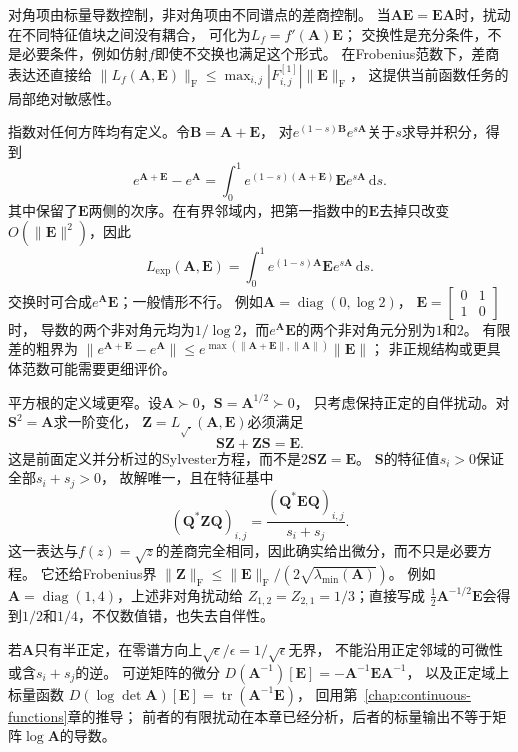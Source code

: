 对角项由标量导数控制，非对角项由不同谱点的差商控制。
当$\bm A\bm E=\bm E\bm A$时，扰动在不同特征值块之间没有耦合，
可化为$L_f=f'(\bm A)\bm E$；
交换性是充分条件，不是必要条件，例如仿射$f$即使不交换也满足这个形式。
在Frobenius范数下，差商表达还直接给
$\lVert L_f(\bm A,\bm E)\rVert_{\mathrm F}
\leq\max_{i,j}|F^{[1]}_{i,j}|\lVert\bm E\rVert_{\mathrm F}$，
这提供当前函数任务的局部绝对敏感性。

指数对任何方阵均有定义。令$\bm B=\bm A+\bm E$，
对$e^{(1-s)\bm B}e^{s\bm A}$关于$s$求导并积分，得到
\[
 e^{\bm A+\bm E}-e^{\bm A}
 =\int_0^1e^{(1-s)(\bm A+\bm E)}\bm E e^{s\bm A}\,\mathrm ds.
\]
其中保留了$\bm E$两侧的次序。在有界邻域内，把第一指数中的$\bm E$去掉只改变
$O(\lVert\bm E\rVert^2)$，因此
\begin{equation}
 L_{\exp}(\bm A,\bm E)
 =\int_0^1e^{(1-s)\bm A}\bm E e^{s\bm A}\,\mathrm ds.
 \label{eq:matrix-analysis-exponential-frechet-derivative}
\end{equation}
交换时可合成$e^{\bm A}\bm E$；一般情形不行。
例如$\bm A=\operatorname{diag}(0,\log2)$，
$\bm E=\left[\begin{smallmatrix}0&1\\1&0\end{smallmatrix}\right]$时，
导数的两个非对角元均为$1/\log2$，而$e^{\bm A}\bm E$的两个非对角元分别为$1$和$2$。
有限差的粗界为
$\lVert e^{\bm A+\bm E}-e^{\bm A}\rVert
\leq e^{\max(\lVert\bm A+\bm E\rVert,\lVert\bm A\rVert)}\lVert\bm E\rVert$；
非正规结构或更具体范数可能需要更细评价。

平方根的定义域更窄。设$\bm A\succ0$，$\bm S=\bm A^{1/2}\succ0$，
只考虑保持正定的自伴扰动。对$\bm S^2=\bm A$求一阶变化，
$\bm Z=L_{\sqrt{\cdot}}(\bm A,\bm E)$必须满足
\[
 \bm S\bm Z+\bm Z\bm S=\bm E.
\]
这是前面定义并分析过的Sylvester方程，而不是$2\bm S\bm Z=\bm E$。
$\bm S$的特征值$s_i>0$保证全部$s_i+s_j>0$，
故解唯一，且在特征基中
\[
 (\bm Q^*\bm Z\bm Q)_{i,j}
 =\frac{(\bm Q^*\bm E\bm Q)_{i,j}}{s_i+s_j}.
\]
这一表达与$f(z)=\sqrt z$的差商完全相同，因此确实给出微分，而不只是必要方程。
它还给Frobenius界
$\lVert\bm Z\rVert_{\mathrm F}
\leq\lVert\bm E\rVert_{\mathrm F}/(2\sqrt{\lambda_{\min}(\bm A)})$。
例如$\bm A=\operatorname{diag}(1,4)$，上述非对角扰动给
$Z_{1,2}=Z_{2,1}=1/3$；直接写成
$\tfrac12\bm A^{-1/2}\bm E$会得到$1/2$和$1/4$，不仅数值错，也失去自伴性。

若$\bm A$只有半正定，在零谱方向上$\sqrt\epsilon/\epsilon=1/\sqrt\epsilon$无界，
不能沿用正定邻域的可微性或含$s_i+s_j$的逆。
可逆矩阵的微分
$D(\bm A^{-1})[\bm E]=-\bm A^{-1}\bm E\bm A^{-1}$，
以及正定域上标量函数
$D(\log\det\bm A)[\bm E]=\operatorname{tr}(\bm A^{-1}\bm E)$，
回用第~\ref{chap:continuous-functions}章的推导；
前者的有限扰动在本章已经分析，后者的标量输出不等于矩阵$\log\bm A$的导数。

